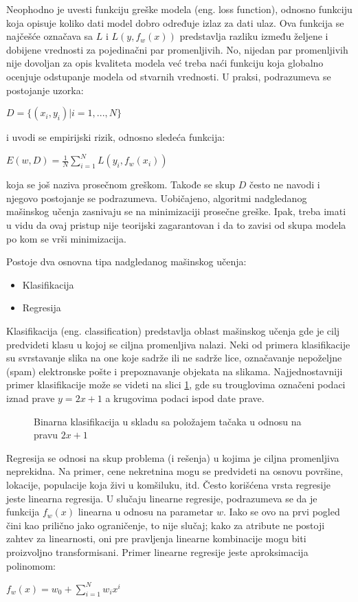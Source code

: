 \par
Neophodno je uvesti funkciju greške modela (eng. loss function), odnosno funkciju koja opisuje koliko dati model dobro određuje izlaz za dati ulaz. Ova funkcija se najčešće označava sa $L$ i $L(y, f_w(x))$ predstavlja razliku između željene i dobijene vrednosti za pojedinačni par promenljivih. No, nijedan par promenljivih nije dovoljan za opis kvaliteta modela već treba naći funkciju koja globalno ocenjuje odstupanje modela od stvarnih vrednosti. U praksi, podrazumeva se postojanje uzorka:
\begin{center}
	$D=\{(x_i, y_i)|i=1,...,N\}$
\end{center}
i uvodi se empirijski rizik, odnosno sledeća funkcija:
\begin{center}
	$E(w, D) = \frac{1}{N}\sum_{i=1}^{N}L(y_i, f_w(x_i))$
\end{center}
koja se još naziva prosečnom greškom. Takođe se skup $D$ često ne navodi i njegovo postojanje se podrazumeva. Uobičajeno, algoritmi nadgledanog mašinskog učenja zasnivaju se na minimizaciji prosečne greške. Ipak, treba imati u vidu da ovaj pristup nije teorijski zagarantovan i da to zavisi od skupa modela po kom se vrši minimizacija. \par

Postoje dva osnovna tipa nadgledanog mašinskog učenja:
\begin{itemize}
	\item Klasifikacija 
	\item Regresija
\end{itemize}

Klasifikacija (eng. classification) predstavlja oblast mašinskog učenja gde je cilj predvideti klasu u kojoj se ciljna promenljiva nalazi. Neki od primera klasifikacije su svrstavanje slika na one koje sadrže ili ne sadrže lice, označavanje nepoželjne (spam) elektronske pošte i prepoznavanje objekata na slikama. 
Najjednostavniji primer klasifikacije može se videti na slici \ref{fig:bin_klas}, gde su trouglovima označeni podaci iznad prave $y=2x+1$ a krugovima podaci ispod date prave.

\begin{figure}
	\centering
	\resizebox{.8\linewidth}{!}{}
	\caption{Binarna klasifikacija u skladu sa položajem tačaka u odnosu na pravu $2x+1$}
	\label{fig:bin_klas}
\end{figure}

\par
Regresija se odnosi na skup problema (i rešenja) u kojima je ciljna promenljiva neprekidna. Na primer, cene nekretnina mogu se predvideti na osnovu površine, lokacije, populacije koja živi u komšiluku, itd. Često korišćena vrsta regresije jeste linearna regresija. U slučaju linearne regresije, podrazumeva se da je funkcija $f_w(x)$ linearna u odnosu na parametar $w$. Iako se ovo na prvi pogled čini kao prilično jako ograničenje, to nije slučaj; kako za atribute ne postoji zahtev za linearnosti, oni pre pravljenja linearne kombinacije mogu biti proizvoljno transformisani. Primer linearne regresije jeste aproksimacija polinomom:
\begin{center}
	$f_w(x) = w_0 + \sum_{i=1}^{N}w_ix^i$
\end{center}

